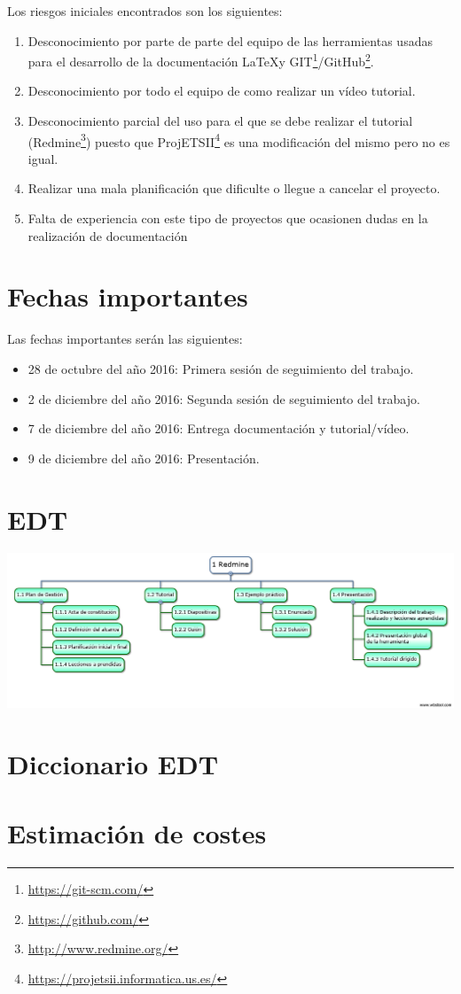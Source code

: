 \documentclass[a4paper,10pt]{scrartcl}
\begin{document}
Los riesgos iniciales encontrados son los siguientes:
\begin{enumerate}
	\item Desconocimiento por parte de parte del equipo de las herramientas usadas para el desarrollo de la documentación \LaTeX y GIT\footnote{\url{https://git-scm.com/}}/GitHub\footnote{\url{https://github.com/}}.
	
	\item Desconocimiento por todo el equipo de como realizar un vídeo tutorial.
	
	\item Desconocimiento parcial del uso para el que se debe realizar el tutorial (Redmine\footnote{\url{http://www.redmine.org/}}) puesto que ProjETSII\footnote{\url{https://projetsii.informatica.us.es/}} es una modificación del mismo pero no es igual.
	
	\item Realizar una mala planificación que dificulte o llegue a cancelar el proyecto.
	
	\item Falta de experiencia con este tipo de proyectos que ocasionen dudas en la realización de documentación 
\end{enumerate}


\section{Fechas importantes}
Las fechas importantes serán las siguientes:

	\begin{itemize}
		\item 28 de octubre del año 2016: Primera sesión de seguimiento del trabajo.
		
		\item 2 de diciembre del año 2016: Segunda sesión de seguimiento del trabajo.
		
		\item 7 de diciembre del año 2016: Entrega documentación y tutorial/vídeo.
		
		\item 9 de diciembre del año 2016: Presentación.
	\end{itemize}

\section{EDT}

	\begin{center}
		\includegraphics[width=\linewidth]{EDT}
	\end{center}

\section{Diccionario EDT}

\section{Estimación de costes}



\end{document}
